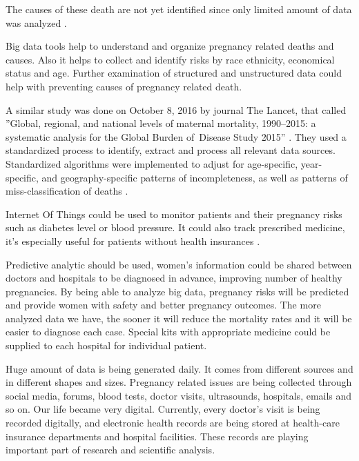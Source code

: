 \documentclass[sigconf]{acmart}
\begin{document}
The causes of these death are not yet identified since only limited amount of data was analyzed \cite{creanga2012race}.

Big data tools help to understand and organize pregnancy related deaths and causes. Also it helps to collect and identify risks by race ethnicity, economical status and age. Further examination of structured and unstructured data could help with preventing causes of pregnancy related death.

A similar study was done on October 8, 2016 by  journal The Lancet, that called ''Global, regional, and national levels of maternal mortality, 1990–2015: a systematic analysis for the Global Burden of Disease Study 2015'' \cite{kassebaum2016global}. They used a standardized process to identify, extract and process all relevant data sources. Standardized algorithms were implemented to adjust for age-specific, year-specific, and geography-specific patterns of incompleteness, as well as patterns of miss-classification of deaths \cite{mcginnis2013best}.

Internet Of Things could be used to  monitor patients and their pregnancy risks  such as diabetes level or blood pressure. It could also track prescribed medicine, it’s especially useful for patients without health insurances \cite{kassebaum2016global}. 

Predictive analytic should be used, women’s information could be shared between doctors and hospitals to be diagnosed in advance, improving number of healthy pregnancies. By being able to analyze big data, pregnancy risks will be predicted and provide women with safety and better pregnancy outcomes. The more analyzed data we have, the sooner it will reduce the mortality rates and it will be easier to diagnose each case. Special kits with appropriate medicine could be supplied to each hospital for individual patient.

Huge amount of data is being generated daily. It comes from different sources and in different shapes and sizes. Pregnancy related issues are being collected through social media, forums, blood tests, doctor visits, ultrasounds, hospitals, emails and so on. Our life became very digital. Currently, every doctor’s visit is being recorded digitally, and electronic health records are being stored at health-care insurance departments and hospital facilities. These records are playing important part of research and scientific analysis.
\end{document}
